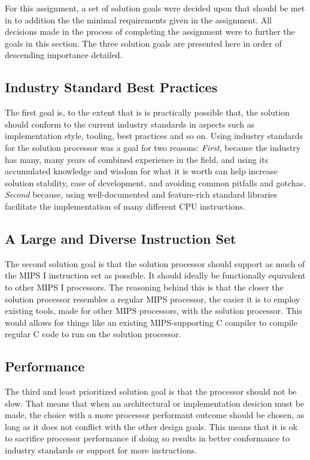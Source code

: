 For this assignment, a set of solution goals were decided upon that should be met in to addition the the minimal requirements given in the assignment.
All decisions made in the process of completing the assignment were to further the goals in this section.
The three solution goals are presented here in order of descending importance detailed.

\subsection{Industry Standard Best Practices} \label{sec:goals-industry-standards}

The first goal is, to the extent that is is practically possible that, the solution should conform to the current industry standards in aspects such as implementation style, tooling, best practices and so on.
Using industry standards for the solution processor was a goal for two reasons:
\textit{First}, because the industry has many, many years of combined experience in the field, and using its accumulated knowledge and wisdom for what it is worth can help increase solution stability, ease of development, and avoiding common pitfalls and gotchas.
\textit{Second} because, using well-documented and feature-rich standard libraries facilitate the implementation of many different CPU instructions.

\subsection{A Large and Diverse Instruction Set} \label{sec:goals-instruction-set}

The second solution goal is that the solution processor should support as much of the MIPS I instruction set as possible.
It should ideally be functionally equivalent to other MIPS I processors.
The reasoning behind this is that the closer the solution processor resembles a regular MIPS processor, the easier it is to employ existing tools, made for other MIPS processors, with the solution processor.
This would allows for things like an existing MIPS-supporting C compiler to compile regular C code to run on the solution processor.

\subsection{Performance} \label{sec:goals-performance}

The third and least prioritized solution goal is that the processor should not be slow.
That means that when an architectural or implementation desicion must be made, the choice with a more processor performant outcome should be chosen, as long as it does not conflict with the other design goals.
This means that it is ok to sacrifice processor performance if doing so results in better conformance to industry standards or support for more instructions.

